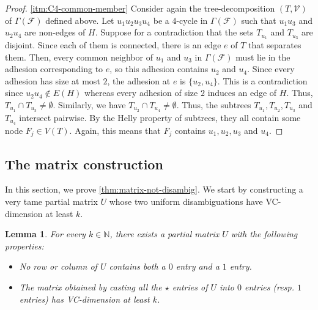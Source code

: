 \documentclass[11pt]{article}
\newtheorem{lemma}[theorem]{Lemma}
\theoremstyle{remark}
\begin{document}
\begin{proof}
    \ref{itm:C4-common-member} Consider again the tree-decomposition $(T, \mathcal{V})$ of $\Gamma(\mathcal{F})$ defined above.
    Let $u_1u_2u_3u_4$ be a $4$-cycle in $\Gamma(\mathcal{F})$ such that $u_1u_3$ and $u_2u_4$ are non-edges of $H$.
    Suppose for a contradiction that the sets $T_{u_1}$ and $T_{u_3}$ are disjoint.
    Since each of them is connected, there is an edge $e$ of $T$ that separates them.
    Then, every common neighbor of $u_1$ and $u_3$ in $\Gamma(\mathcal{F})$ must lie in the adhesion corresponding to $e$, so this adhesion contains $u_2$ and $u_4$.
    Since every adhesion has size at most $2$, the adhesion at $e$ is $\{u_2, u_4\}$.
    This is a contradiction since $u_2u_4 \notin E(H)$ whereas every adhesion of size $2$ induces an edge of $H$.
    Thus, $T_{u_1} \cap T_{u_3} \neq \emptyset$.
    Similarly, we have $T_{u_2} \cap T_{u_4} \neq \emptyset$.
    Thus, the subtrees $T_{u_1}, T_{u_2}, T_{u_3}$ and $T_{u_4}$ intersect pairwise.
    By the Helly property of subtrees, they all contain some node $F_j \in V(T)$.
    Again, this means that $F_j$ contains $u_1, u_2, u_3$ and $u_4$.
\end{proof}

\subsection{The matrix construction}

In this section, we prove \cref{thm:matrix-not-disambig}.
We start by constructing a very tame partial matrix $U$ whose two uniform disambiguations have VC-dimension at least $k$.

\begin{lemma}\label{lem:universal-matrix-simple}
    For every $k \in \mathbb{N}$, there exists a partial matrix $U$ with the following properties: \begin{itemize}
        \item No row or column of $U$ contains both a $0$ entry and a $1$ entry.
        \item The matrix obtained by casting all the $\star$ entries of $U$ into $0$ entries (resp. $1$ entries) has VC-dimension at least $k$.
    \end{itemize}
\end{lemma}
\end{document}
